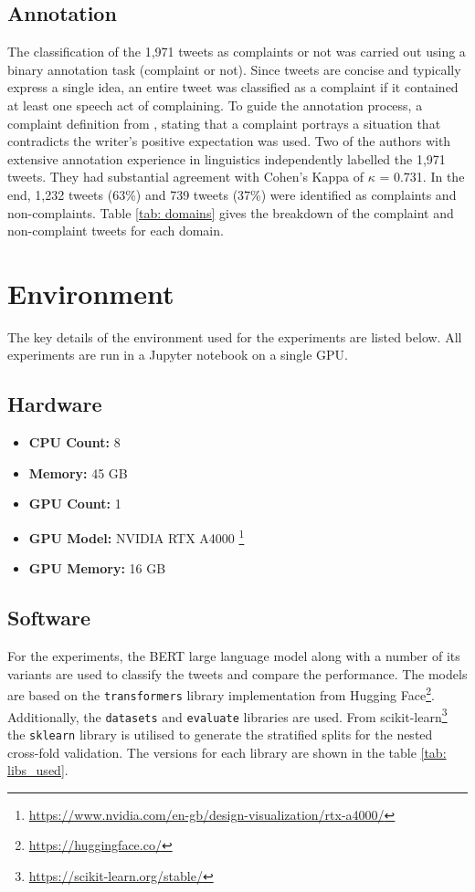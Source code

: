 \subsection{Annotation}
The classification of the 1,971 tweets as complaints or not was carried out using a binary annotation task (complaint or not). Since tweets are concise and typically express a single idea, an entire tweet was classified as a complaint if it contained at least one speech act of complaining. To guide the annotation process, a complaint definition from \cite{olshtain_speechact_1987}, stating that a complaint portrays a situation that contradicts the writer's positive expectation was used. Two of the authors with extensive annotation experience in linguistics independently labelled the 1,971 tweets. They had substantial agreement \cite{artsteinInterCoderAgreementComputational2008} with Cohen's Kappa of $\kappa$ = 0.731. In the end, 1,232 tweets (63\%) and 739 tweets (37\%) were identified as complaints and non-complaints. Table \ref{tab: domains} gives the breakdown of the complaint and non-complaint tweets for each domain.

\section{Environment}

The key details of the environment used for the experiments are listed below. All experiments are run in a Jupyter notebook on a single GPU. 
\subsection{Hardware}
\begin{itemize}
    \small
    \item \textbf{CPU Count:} 8
    \item \textbf{Memory:} 45 GB
    \item \textbf{GPU Count:} 1
    \item \textbf{GPU Model:} NVIDIA RTX A4000 \footnote{\url{https://www.nvidia.com/en-gb/design-visualization/rtx-a4000/}}
    \item \textbf{GPU Memory:} 16 GB
\end{itemize}

\subsection{Software}
For the experiments, the BERT large language model along with a number of its variants are used to classify the tweets and compare the performance. The models are based on the \texttt{transformers} library implementation from Hugging Face\footnote{\url{https://huggingface.co/}}. Additionally, the \texttt{datasets} and \texttt{evaluate} libraries are used. From scikit-learn\footnote{\url{https://scikit-learn.org/stable/}} the \texttt{sklearn} library is utilised to generate the stratified splits for the nested cross-fold validation. The versions for each library are shown in the table \ref{tab: libs_used}.

